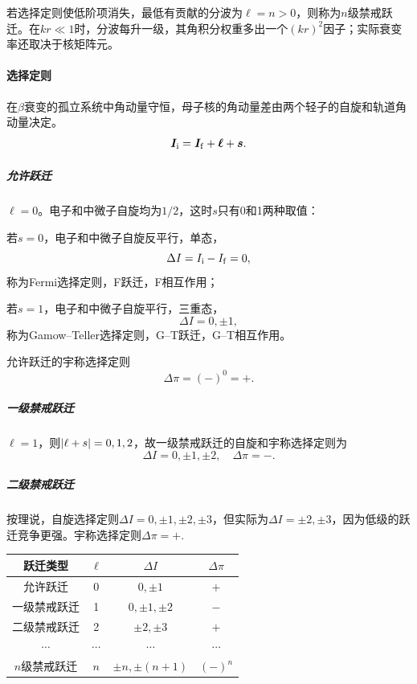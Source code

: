 若选择定则使低阶项消失，最低有贡献的分波为$\ell = n > 0$，则称为$n$级禁戒跃迁。在$kr \ll 1$时，分波每升一级，其角积分权重多出一个$(kr)^2$因子；实际衰变率还取决于核矩阵元。
\paragraph{选择定则}在$\beta$衰变的孤立系统中角动量守恒，母子核的角动量差由两个轻子的自旋和轨道角动量决定。
\begin{equation}\label{eq:nrd-beta-angular-momentum}
	\bm I_\mathrm i = \bm I_\mathrm f + \bm\ell + \bm s.
\end{equation}

\subparagraph{允许跃迁}
$\ell = 0$。电子和中微子自旋均为$1/2$，这时$s$只有0和1两种取值：
\begin{compactenum}
	\item 若$s = 0$，电子和中微子自旋反平行，单态，
	\begin{equation}\label{eq:nrd-fermi-selection-rule}
		\Delta I = I_\mathrm i - I_\mathrm f = 0,
	\end{equation}
	称为Fermi选择定则，F跃迁，F相互作用；
	\item 若$s = 1$，电子和中微子自旋平行，三重态，
	\begin{equation}\label{eq:nrd-gamow-teller-selection-rule}
		\Delta I = 0,\pm1,
	\end{equation}
	称为Gamow--Teller选择定则，G--T跃迁，G--T相互作用。
\end{compactenum}
允许跃迁的宇称选择定则
\begin{equation}\label{eq:nrd-allowed-beta-parity}
	\Delta\pi = (-)^0 = +.
\end{equation}
\subparagraph{一级禁戒跃迁}
$\ell = 1$，则$\lvert\ell + s\rvert = 0,1,2$，故一级禁戒跃迁的自旋和宇称选择定则为
\begin{equation}\label{eq:nrd-first-forbidden-selection-rule}
	\Delta I = 0,\pm1,\pm2,\quad\Delta\pi = -.
\end{equation}
\subparagraph{二级禁戒跃迁}
按理说，自旋选择定则$\Delta I = 0,\pm1,\pm2,\pm3$，但实际为$\Delta I = \pm2,\pm3$，因为低级的跃迁竞争更强。宇称选择定则$\Delta\pi = +.$
\begin{notecaptionblock}
	\begin{tabular}{cccc}
		\toprule
		跃迁类型&$\ell$&$\Delta I$&$\Delta\pi$\\
		\midrule
		允许跃迁&0&$0,\pm1$&$+$\\
		一级禁戒跃迁&1&$0,\pm1,\pm2$&$-$\\
		二级禁戒跃迁&2&$\pm2,\pm3$&$+$\\
		$\cdots$&$\cdots$&$\cdots$&$\cdots$\\
		$n$级禁戒跃迁&$n$&$\pm n,\pm(n + 1)$&$(-)^n$\\
		\bottomrule
	\end{tabular}
\end{notecaptionblock}

